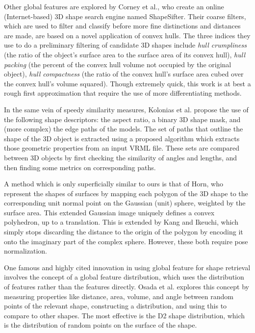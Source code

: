 \documentclass[../tech_report_1.tex]{subfiles}
\begin{document}
Other global features are explored by Corney et al.\cite{corney2002coarse}, who create an online (Internet-based) 3D shape search engine named ShapeSifter. Their coarse filters, which are used to filter and classify before more fine distinctions and distances are made, are based on a novel application of convex hulls. The three indices they use to do a preliminary filtering of candidate 3D shapes include \textit{hull crumpliness} (the ratio of the object's surface area to the surface area of its convex hull), \textit{hull packing} (the percent of the convex hull volume not occupied by the original object), \textit{hull compactness} (the ratio of the convex hull's surface area cubed over the convex hull's volume squared). Though extremely quick, this work is at best a rough first approximation that require the use of more differentiating methods.

In the same vein of speedy similarity measures, Kolonias et al.\cite{kolonias2005fast} propose the use of the following shape descriptors: the aspect ratio, a binary 3D shape mask, and (more complex) the edge paths of the models. The set of paths that outline the shape of the 3D object is extracted using a proposed algorithm which extracts those geometric properties from an input VRML file. These sets are compared between 3D objects by first checking the similarity of angles and lengths, and then finding some metrics on corresponding paths.

A method which is only superficially similar to ours is that of Horn\cite{horn1984extended}, who represent the shapes of surfaces by mapping each polygon of the 3D shape to the corresponding unit normal point on the Gaussian (unit) sphere, weighted by the surface area. This extended Gaussian image uniquely defines a convex polyhedron, up to a translation. This is extended by Kang and Ikeuchi\cite{kang1991determining}, which simply stops discarding the distance to the origin of the polygon by encoding it onto the imaginary part of the complex sphere. However, these both require pose normalization.

One famous and highly cited innovation in using global feature for shape retrieval involves the concept of a global feature distribution, which uses the distribution of features rather than the features directly. Osada et al.\cite{osada2002shape} explores this concept by measuring properties like distance, area, volume, and angle between random points of the relevant shape, constructing a distribution, and using this to compare to other shapes. The most effective is the D2 shape distribution, which is the distribution of random points on the surface of the shape.
\end{document}
